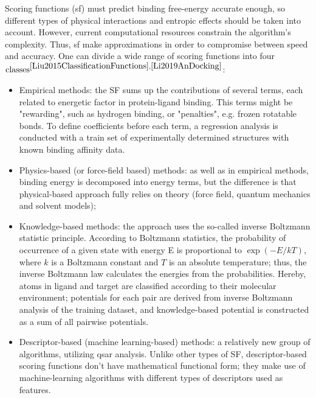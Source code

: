   Scoring functions (\acrshort{sf}) must predict binding free-energy accurate enough, so different types of physical interactions and entropic effects should be taken into account.
  However, current computational resources constrain the algorithm's complexity.
  Thus, \acrshort{sf} make approximations in order to compromise between speed and accuracy. One can divide a wide range of scoring functions into four $\text{classes}^{\cite{Liu2015ClassificationFunctions}, \cite{Li2019AnDocking}}$:
  \begin{itemize}
        \item Empirical methods: the SF sums up the contributions of several terms, each related to energetic factor in protein-ligand binding.
        This terms might be "rewarding", such as hydrogen binding, or "penalties", e.g. frozen rotatable bonds.
        To define coefficients before each term, a regression analysis is conducted with a train set of experimentally determined structures with known binding affinity data.
       \item Physics-based (or force-field based) methods: as well as in empirical methods, binding energy is decomposed into energy terms, but the difference is that physical-based approach fully relies on theory (force field, quantum mechanics and solvent models);
      \item Knowledge-based methods: the approach uses the so-called inverse Boltzmann statistic principle.
      According to Boltzmann statistics, the probability of occurrence of a given state with energy E is proportional to $\exp{(-E/kT)}$, where $k$ is a Boltzmann constant and $T$ is an absolute temperature; thus, the inverse Boltzmann law calculates the energies from the probabilities.
      Hereby, atoms in ligand and target are classified according to their molecular environment; potentials for each pair are derived from inverse Boltzmann analysis of the training dataset, and knowledge-based potential is constructed as a sum of all pairwise potentials.
      \item Descriptor-based (machine learning-based) methods: a relatively new group of algorithms, utilizing \acrshort{qsar} analysis.
      Unlike other types of SF, descriptor-based scoring functions don't have mathematical functional form; they make use of machine-learning algorithms with different types of descriptors used as features. 
  \end{itemize}

